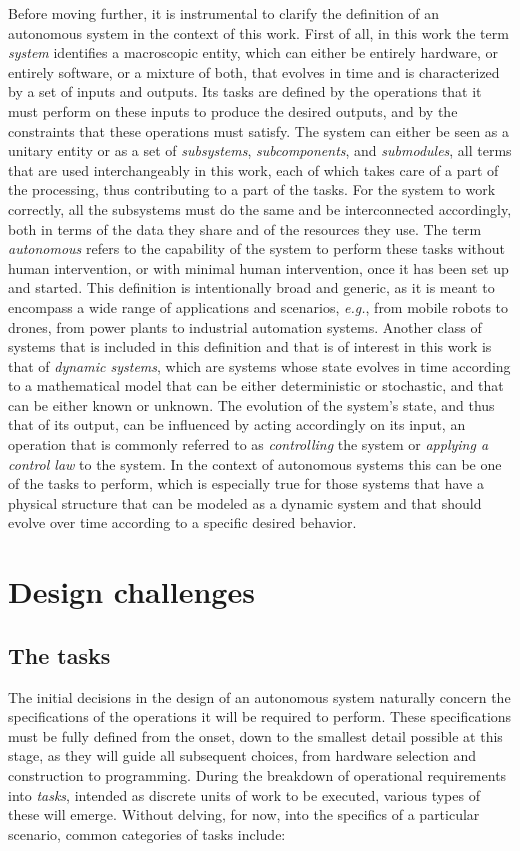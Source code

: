 Before moving further, it is instrumental to clarify the definition of an autonomous system in the context of this work. First of all, in this work the term \emph{system} identifies a macroscopic entity, which can either be entirely hardware, or entirely software, or a mixture of both, that evolves in time and is characterized by a set of inputs and outputs. Its tasks are defined by the operations that it must perform on these inputs to produce the desired outputs, and by the constraints that these operations must satisfy. The system can either be seen as a unitary entity or as a set of \emph{subsystems}, \emph{subcomponents}, and \emph{submodules}, all terms that are used interchangeably in this work, each of which takes care of a part of the processing, thus contributing to a part of the tasks. For the system to work correctly, all the subsystems must do the same and be interconnected accordingly, both in terms of the data they share and of the resources they use. The term \emph{autonomous} refers to the capability of the system to perform these tasks without human intervention, or with minimal human intervention, once it has been set up and started. This definition is intentionally broad and generic, as it is meant to encompass a wide range of applications and scenarios, \emph{e.g.}, from mobile robots to drones, from power plants to industrial automation systems. Another class of systems that is included in this definition and that is of interest in this work is that of \emph{dynamic systems}, which are systems whose state evolves in time according to a mathematical model that can be either deterministic or stochastic, and that can be either known or unknown. The evolution of the system's state, and thus that of its output, can be influenced by acting accordingly on its input, an operation that is commonly referred to as \emph{controlling} the system or \emph{applying a control law} to the system. In the context of autonomous systems this can be one of the tasks to perform, which is especially true for those systems that have a physical structure that can be modeled as a dynamic system and that should evolve over time according to a specific desired behavior.

\section{Design challenges}
\label{sec:prb_design_challenges}
\subsection{The tasks}
\label{sec:design_challenges_tasks}
The initial decisions in the design of an autonomous system naturally concern the specifications of the operations it will be required to perform. These specifications must be fully defined from the onset, down to the smallest detail possible at this stage, as they will guide all subsequent choices, from hardware selection and construction to programming. During the breakdown of operational requirements into \emph{tasks}, intended as discrete units of work to be executed, various types of these will emerge. Without delving, for now, into the specifics of a particular scenario, common categories of tasks include:

